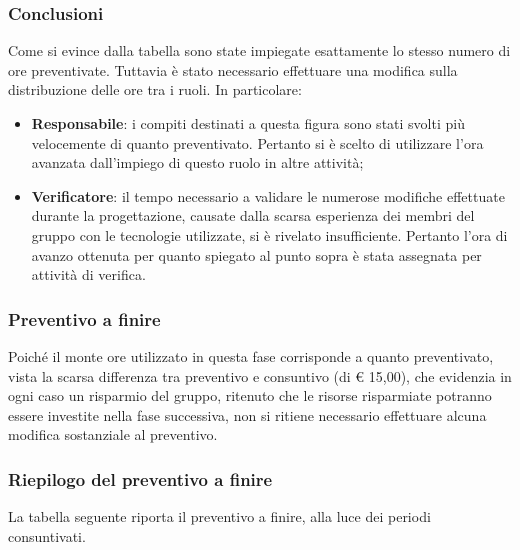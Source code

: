 \subsubsection{Conclusioni}
Come si evince dalla tabella sono state impiegate esattamente lo stesso numero di ore preventivate. Tuttavia è stato necessario effettuare una modifica sulla distribuzione delle ore tra i ruoli. In particolare:
\begin{itemize}
	\item \textbf{Responsabile}: i compiti destinati a questa figura  sono stati svolti più velocemente di quanto preventivato. Pertanto si è scelto di utilizzare l'ora avanzata dall'impiego di questo ruolo in altre attività;
	\item  \textbf{Verificatore}: il tempo necessario a validare le numerose modifiche effettuate durante la progettazione, causate dalla scarsa esperienza dei membri del gruppo con le tecnologie utilizzate, si è rivelato insufficiente. Pertanto l'ora di avanzo ottenuta per quanto spiegato al punto sopra è stata assegnata per attività di verifica.
\end{itemize}

\subsubsection{Preventivo a finire}
Poiché il monte ore utilizzato in questa fase corrisponde a quanto preventivato, vista la scarsa differenza tra preventivo e consuntivo (di € 15,00), che evidenzia in ogni caso un risparmio del gruppo, ritenuto che le risorse risparmiate potranno essere investite nella fase successiva, non si ritiene necessario effettuare alcuna modifica sostanziale al preventivo.



\subsubsection{Riepilogo del preventivo a finire}\label{riepilogoPAF}

La tabella seguente riporta il preventivo a finire, alla luce dei periodi consuntivati.

